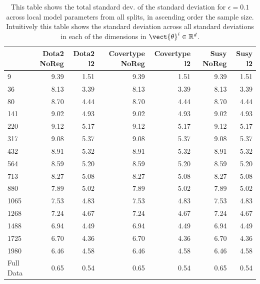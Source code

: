         \begin{table}[!htb]
            \centering
            \caption[]{This table shows the total standard dev. of the standard deviation for $\epsilon=0.1$ across local model parameters from all splits, in ascending order \wrt the sample size. Intuitively this table shows the standard deviation across all standard deviations in each of the dimensions in $\vect{\theta}^i \in \mathbb{R}^d$.
            }
            \label{tab:std_std_01}
            \begin{tabular}{l||rr|rr|rr}
            \toprule
            {} &  Dota2 NoReg &  Dota2 l2 &  Covertype NoReg &  Covertype l2 &  Susy NoReg &  Susy l2 \\
            \midrule
            9     &         9.39 &      1.51 &             9.39 &          1.51 &        9.39 &     1.51 \\
            36    &         8.13 &      3.39 &             8.13 &          3.39 &        8.13 &     3.39 \\
            80    &         8.70 &      4.44 &             8.70 &          4.44 &        8.70 &     4.44 \\
            141   &         9.02 &      4.93 &             9.02 &          4.93 &        9.02 &     4.93 \\
            220   &         9.12 &      5.17 &             9.12 &          5.17 &        9.12 &     5.17 \\
            317   &         9.08 &      5.37 &             9.08 &          5.37 &        9.08 &     5.37 \\
            432   &         8.91 &      5.32 &             8.91 &          5.32 &        8.91 &     5.32 \\
            564   &         8.59 &      5.20 &             8.59 &          5.20 &        8.59 &     5.20 \\
            713   &         8.27 &      5.08 &             8.27 &          5.08 &        8.27 &     5.08 \\
            880   &         7.89 &      5.02 &             7.89 &          5.02 &        7.89 &     5.02 \\
            1065  &         7.53 &      4.83 &             7.53 &          4.83 &        7.53 &     4.83 \\
            1268  &         7.24 &      4.67 &             7.24 &          4.67 &        7.24 &     4.67 \\
            1488  &         6.94 &      4.49 &             6.94 &          4.49 &        6.94 &     4.49 \\
            1725  &         6.70 &      4.36 &             6.70 &          4.36 &        6.70 &     4.36 \\
            1980  &         6.46 &      4.58 &             6.46 &          4.58 &        6.46 &     4.58 \\
            Full Data &         0.65 &      0.54 &             0.65 &          0.54 &        0.65 &     0.54 \\
            \bottomrule
            \end{tabular}
            \end{table}
